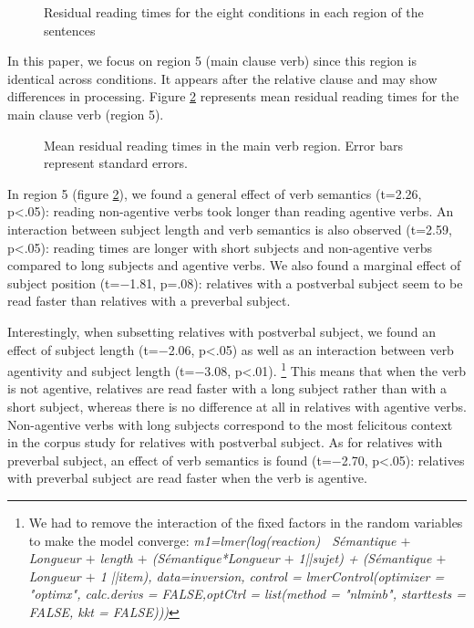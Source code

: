 \documentclass[output=paper]{langscibook}
\begin{document}
\begin{figure}[H]
\caption{Residual reading times for the eight conditions in each region of the sentences}
\label{figureselfpacedallresults}
\end{figure}


In this paper, we focus on region 5 (main clause verb) since this region is identical across conditions. It appears after the relative clause and may show differences in processing. Figure \ref{figureselfpacedregion5} represents mean residual reading times for the main clause verb (region 5).

\begin{figure}[H]
\caption{Mean residual reading times in the main verb region. Error bars represent standard errors.}
\label{figureselfpacedregion5}
\end{figure}

In region 5 (figure \ref{figureselfpacedregion5}), we found a general effect of verb semantics (t=2.26, p<.05): reading non-agentive verbs took longer than reading agentive verbs. An interaction between subject length and verb semantics is also observed (t=2.59, p<.05): reading times are longer with short subjects and non-agentive verbs compared to long subjects and agentive verbs. We also found a marginal effect of subject position (t=$-$1.81, p=.08): relatives with a postverbal subject seem to be read faster than relatives with a preverbal subject. 


Interestingly, when subsetting relatives with postverbal subject, we found an effect of subject length (t=$-$2.06, p<.05) as well as an interaction between verb agentivity and subject length (t=$-$3.08, p<.01). \footnote{We had to remove the interaction of the fixed factors in the random variables to make the model converge: \textit{m1=lmer(log(reaction) $~$ Sémantique $+$ Longueur $+$ length $+$ (Sémantique*Longueur $+$ 1||sujet) + (Sémantique $+$ Longueur $+$ 1 ||item), 
 data=inversion, control = lmerControl(optimizer = "optimx", calc.derivs = FALSE,optCtrl = list(method = "nlminb", starttests = FALSE, kkt = FALSE)))} }
This means that when the verb is not agentive, relatives are read faster with a long subject rather than with a short subject, whereas there is no difference at all in relatives with agentive verbs. Non-agentive verbs with long subjects correspond to the most felicitous context in the corpus study for relatives with postverbal subject. As for relatives with preverbal subject, an effect of verb semantics is found (t=$-$2.70, p<.05): relatives with preverbal subject are read faster when the verb is agentive. 
\end{document}
